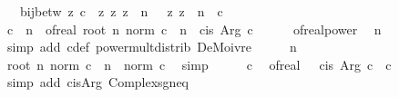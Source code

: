 \begin{isabellebody}
\ \ \ {\isachardoublequoteopen}bij{\isacharunderscore}{\kern0pt}betw\ {\isacharparenleft}{\kern0pt}{\isasymlambda}z{\isachardot}{\kern0pt}\ c{\isacharprime}{\kern0pt}\ {\isacharasterisk}{\kern0pt}\ z{\isacharparenright}{\kern0pt}\ {\isacharbraceleft}{\kern0pt}z{\isachardot}{\kern0pt}\ z\ {\isacharcircum}{\kern0pt}\ n\ {\isacharequal}{\kern0pt}\ {}{\isacharbraceright}{\kern0pt}\ {\isacharbraceleft}{\kern0pt}z{\isachardot}{\kern0pt}\ z\ {\isacharcircum}{\kern0pt}\ n\ {\isacharequal}{\kern0pt}\ c{\isacharbraceright}{\kern0pt}{\isachardoublequoteclose}\isanewline
%
\isadelimproof
%
\endisadelimproof
%
\isatagproof
{}\isamarkupfalse%
\ {\isacharminus}{\kern0pt}\isanewline
\ \ \isamarkupfalse%
\ {\isachardoublequoteopen}c{\isacharprime}{\kern0pt}\ {\isacharcircum}{\kern0pt}\ n\ {\isacharequal}{\kern0pt}\ of{\isacharunderscore}{\kern0pt}real\ {\isacharparenleft}{\kern0pt}root\ n\ {\isacharparenleft}{\kern0pt}norm\ c{\isacharparenright}{\kern0pt}\ {\isacharcircum}{\kern0pt}\ n{\isacharparenright}{\kern0pt}\ {\isacharasterisk}{\kern0pt}\ cis\ {\isacharparenleft}{\kern0pt}Arg\ c{\isacharparenright}{\kern0pt}{\isachardoublequoteclose}\isanewline
\ \ \ \ \isamarkupfalse%
\ of{\isacharunderscore}{\kern0pt}real{\isacharunderscore}{\kern0pt}power\ \isamarkupfalse%
\ n\ \isamarkupfalse%
\ {\isacharparenleft}{\kern0pt}simp\ add{\isacharcolon}{\kern0pt}\ c{\isacharprime}{\kern0pt}{\isacharunderscore}{\kern0pt}def\ power{\isacharunderscore}{\kern0pt}mult{\isacharunderscore}{\kern0pt}distrib\ DeMoivre{\isacharparenright}{\kern0pt}\isanewline
\ \ \isamarkupfalse%
\ \isamarkupfalse%
\ n\ \isamarkupfalse%
\ {\isachardoublequoteopen}root\ n\ {\isacharparenleft}{\kern0pt}norm\ c{\isacharparenright}{\kern0pt}\ {\isacharcircum}{\kern0pt}\ n\ {\isacharequal}{\kern0pt}\ norm\ c{\isachardoublequoteclose}\ \isamarkupfalse%
\ simp\isanewline
\ \ \isamarkupfalse%
\ \isamarkupfalse%
\ c\ \isamarkupfalse%
\ {\isachardoublequoteopen}of{\isacharunderscore}{\kern0pt}real\ {\isasymdots}\ {\isacharasterisk}{\kern0pt}\ cis\ {\isacharparenleft}{\kern0pt}Arg\ c{\isacharparenright}{\kern0pt}\ {\isacharequal}{\kern0pt}\ c{\isachardoublequoteclose}\ \isamarkupfalse%
\ {\isacharparenleft}{\kern0pt}simp\ add{\isacharcolon}{\kern0pt}\ cis{\isacharunderscore}{\kern0pt}Arg\ Complex{\isachardot}{\kern0pt}sgn{\isacharunderscore}{\kern0pt}eq{\isacharparenright}{\kern0pt}\isanewline

\end{isabellebody}
